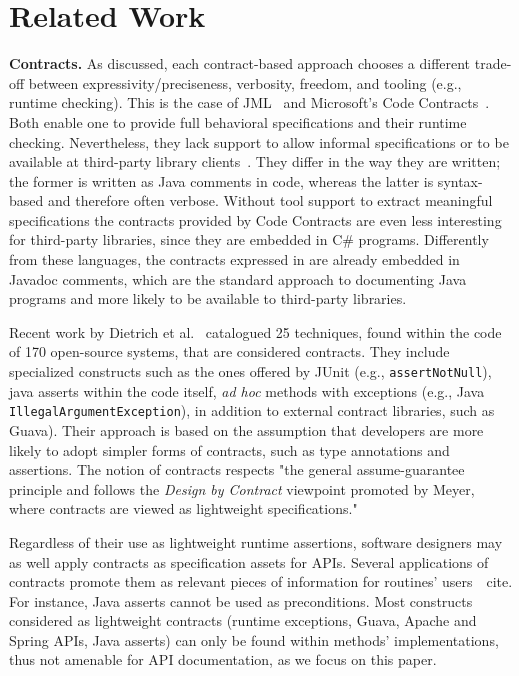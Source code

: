 \section{Related Work}
\label{sec:relatedWork}

\textbf{Contracts.} 
As discussed, each contract-based approach choo\-ses a different trade-off between expressivity/preciseness, verbosity, freedom, and tooling (e.g., runtime checking).
This is the case of JML~\cite{jml} and Microsoft's Code Contracts~\cite{codeContractsPaper}.
Both enable one to provide full behavioral specifications and their runtime checking.
Nevertheless, they lack support to allow informal specifications or to be available at third-party
library clients~\cite{Parnas2011}. They differ in the way they are written; the former is written as Java comments in code, whereas the latter is syntax-based and therefore often verbose. 
Without tool support to extract meaningful specifications the contracts provided by Code Contracts are even less interesting for third-party libraries, since they are embedded in C\# programs. Differently from these languages, the contracts expressed in \contractjdoc{} are already embedded in Javadoc comments, which are the standard approach to documenting Java programs and more likely to be available to third-party libraries.

Recent work by Dietrich et al.~\cite{} catalogued 25 techniques, found within the code of 170 open-source systems, that are considered contracts. They include specialized constructs such as the ones offered by JUnit (e.g., \texttt{assertNotNull}), java asserts within the code itself, \emph{ad hoc} methods with exceptions (e.g., Java \texttt{IllegalArgumentException}), in addition to external contract libraries, such as Guava). 
Their approach is based on the assumption that developers are more likely to adopt simpler forms of contracts, such as type annotations and assertions. The notion of contracts respects "the general assume-guarantee principle and follows the \emph{Design by Contract} viewpoint promoted by Meyer, where contracts are viewed as lightweight specifications."~\cite{} 

Regardless of their use as lightweight runtime assertions, software designers may as well apply contracts as specification assets for APIs. Several applications of contracts promote them as relevant pieces of information for routines' users~\ cite{}. For instance, Java asserts cannot be used as preconditions. Most constructs considered as lightweight contracts (runtime exceptions, Guava, Apache and Spring APIs, Java asserts) can only be found within methods' implementations, thus not amenable for API documentation, as we focus on this paper.

